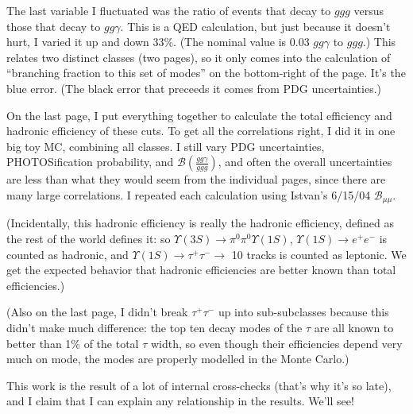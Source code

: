 \documentclass[landscape]{article}
\begin{document}
\vspace{1.4 cm} \hspace{0.2 cm} The last variable I fluctuated was the ratio of events that decay to
$ggg$ versus those that decay to $gg\gamma$.  This is a QED
calculation, but just because it doesn't hurt, I varied it up and down
33\%.  (The nominal value is 0.03 $gg\gamma$ to $ggg$.)  This relates
two distinct classes (two pages), so it only comes into the
calculation of ``branching fraction to this set of modes'' on the
bottom-right of the page.  It's the {\color{blue} blue} error.  (The
black error that preceeds it comes from PDG uncertainties.)

\vspace{1.4 cm} \hspace{0.2 cm} On the last page, I put everything together to calculate the total
efficiency and hadronic efficiency of these cuts.  To get all the
correlations right, I did it in one big toy MC, combining all classes.
I still vary PDG uncertainties, PHOTOSification probability, and
$\mathcal{B}(\frac{gg\gamma}{ggg})$, and often the overall
uncertainties are less than what they would seem from the individual
pages, since there are many large correlations.  I repeated each
calculation using Istvan's 6/15/04 $\mathcal{B}_{\mu\mu}$.

\vspace{1.4 cm} \hspace{0.2 cm} (Incidentally, this hadronic efficiency is really the hadronic
efficiency, defined as the rest of the world defines it: so
$\Upsilon(3S) \to \pi^0 \pi^0 \Upsilon(1S)$, $\Upsilon(1S) \to e^+e^-$
is counted as hadronic, and $\Upsilon(1S) \to \tau^+\tau^- \to$ 10
tracks is counted as leptonic.  We get the expected behavior that
hadronic efficiencies are better known than total efficiencies.)

\vspace{1.4 cm} \hspace{0.2 cm} (Also on the last page, I didn't break $\tau^+\tau^-$ up into
sub-subclasses because this didn't make much difference: the top ten
decay modes of the $\tau$ are all known to better than 1\% of the
total $\tau$ width, so even though their efficiencies depend very much
on mode, the modes are properly modelled in the Monte Carlo.)

\vspace{1.4 cm} \hspace{0.2 cm} This work is the result of a lot of internal cross-checks (that's why
it's so late), and I claim that I can explain any relationship in the
results.  We'll see!
\end{document}
